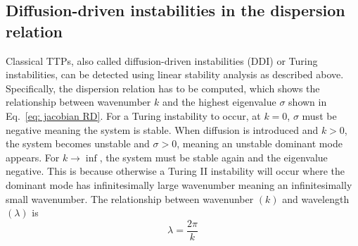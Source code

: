 \subsection{Diffusion-driven instabilities in the dispersion relation}
Classical TTPs, also called diffusion-driven instabilities (DDI) or Turing instabilities, can be detected using linear stability analysis as described above.
Specifically, the dispersion relation has to be computed, which shows the relationship between wavenumber $k$ and the highest eigenvalue $\sigma$ shown in Eq.~\ref{eq: jacobian RD}.
For a Turing instability to occur, at $k=0$, $\sigma$ must be negative meaning the system is stable.
When diffusion is introduced and $k>0$, the system becomes unstable and $\sigma>0$, meaning an unstable dominant mode appears.
For $k \rightarrow \inf$, the system must be stable again and the eigenvalue negative.
This is because otherwise a Turing II instability will occur where the dominant mode has infinitesimally large wavenumber meaning an infinitesimally small wavenumber.
The relationship between wavenunber $(k)$ and wavelength $(\lambda)$ is
\begin{equation}
    \lambda = \frac{2 \pi}{k}
    \label{eq:wavelength_wavenumber}
\end{equation}
